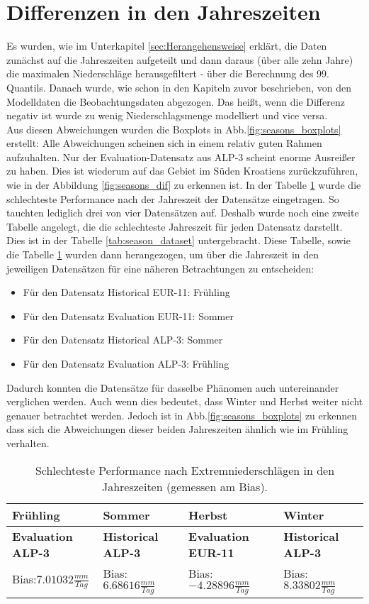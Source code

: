 \section{Differenzen in den Jahreszeiten}
Es wurden, wie im Unterkapitel \ref{sec:Herangehensweise} erklärt, die Daten zunächst auf die Jahreszeiten aufgeteilt und dann daraus (über alle zehn Jahre) die maximalen Niederschläge herausgefiltert - über die Berechnung des 99. Quantils. Danach wurde, wie schon in den Kapiteln zuvor beschrieben, von den Modelldaten die Beobachtungsdaten abgezogen. Das heißt, wenn die Differenz negativ ist wurde zu wenig Niederschlagsmenge modelliert und vice versa.\\
Aus diesen Abweichungen wurden die Boxplots in Abb.\ref{fig:seasons_boxplots} erstellt: Alle Abweichungen scheinen sich in einem relativ guten Rahmen aufzuhalten. Nur der Evaluation-Datensatz aus ALP-3 scheint enorme Ausreißer zu haben. Dies ist wiederum auf das Gebiet im Süden Kroatiens zurückzuführen, wie in der Abbildung \ref{fig:seasons_dif} zu erkennen ist. In der Tabelle \ref{tab:season_bias} wurde die schlechteste Performance nach der Jahreszeit der Datensätze eingetragen. So tauchten lediglich drei von vier Datensätzen auf. Deshalb wurde noch eine zweite Tabelle angelegt, die die schlechteste Jahreszeit für jeden Datensatz darstellt. Dies ist in der Tabelle \ref{tab:season_dataset} untergebracht. Diese Tabelle, sowie die Tabelle \ref{tab:season_bias} wurden dann herangezogen, um über die Jahreszeit in den jeweiligen Datensätzen für eine näheren Betrachtungen zu entscheiden:
\begin{itemize}
	\item Für den Datensatz Historical EUR-11: Frühling
	\item Für den Datensatz Evaluation EUR-11: Sommer
	\item Für den Datensatz Historical ALP-3: Sommer
	\item Für den Datensatz Evaluation ALP-3: Frühling
\end{itemize}
Dadurch konnten die Datensätze für dasselbe Phänomen auch untereinander verglichen werden. Auch wenn dies bedeutet, dass Winter und Herbst weiter nicht genauer betrachtet werden. Jedoch ist in Abb.\ref {fig:seasons_boxplots} zu erkennen dass sich die Abweichungen dieser beiden Jahreszeiten ähnlich wie im Frühling verhalten.
\begin{table}[h]
	\begin{tabularx}{\textwidth}{|X|X|X|X|}
		\hline
		\textbf{Frühling} & \textbf{Sommer}& \textbf{Herbst} & \textbf{Winter}\\
		\hline
		\textbf{Evaluation ALP-3}  & \textbf{Historical ALP-3}  & \textbf{Evaluation EUR-11} & \textbf{Historical ALP-3} \\
		Bias:$7.01032\frac{mm}{Tag}$& Bias:$6.68616\frac{mm}{Tag}$ & Bias: $-4.28896\frac{mm}{Tag}$ & Bias:$8.33802\frac{mm}{Tag}$\\
		\hline
	\end{tabularx}
	\caption{Schlechteste Performance nach Extremniederschlägen in den Jahreszeiten (gemessen am Bias).}
	\label{tab:season_bias}
\end{table}
